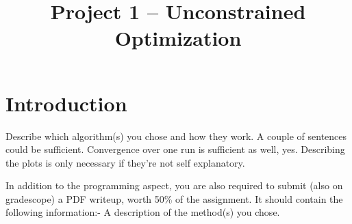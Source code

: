 \documentclass[conference]{IEEEtran}
\begin{document}
\title{\LARGE \textbf{Project 1 -- Unconstrained Optimization} 
}


\author{
} %


\maketitle

\begin{abstract}
\end{abstract}


\section{Introduction}
\label{sec:introduction}







Describe which algorithm(s) you chose and how they work. A couple of sentences could be sufficient. Convergence over one run is sufficient as well, yes. Describing the plots is only necessary if they're not self explanatory.

In addition to the programming aspect, you are also required to submit (also on gradescope) a PDF writeup, worth 50\% of the assignment. It should contain the following information:- A description of the method(s) you chose.
\end{document}
